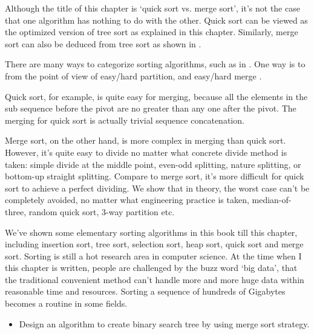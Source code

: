 \documentclass[UTF8]{article}
\begin{document}
Although the title of this chapter is `quick sort vs. merge sort', it's not the case that one
algorithm has nothing to do with the other. Quick sort can be viewed as the optimized version of
tree sort as explained in this chapter. Similarly, merge sort can also be deduced from tree sort
as shown in \cite{sort-deriving}.

There are many ways to categorize sorting algorithms, such as in \cite{TAOCP}. One way is to
from the point of view of easy/hard partition, and easy/hard merge \cite{algo-fp}.

Quick sort, for example, is quite easy for merging, because all the elements in the sub
sequence before the pivot are no greater than any one after the pivot. The merging for
quick sort is actually trivial sequence concatenation.

Merge sort, on the other hand, is more complex in merging than quick sort. However, it's
quite easy to divide no matter what concrete divide method is taken:
simple divide at the middle point, even-odd splitting, nature splitting, or bottom-up
straight splitting. Compare to merge sort, it's more difficult for quick sort to
achieve a perfect dividing. We show that in theory, the worst case can't be completely
avoided, no matter what engineering practice is taken, median-of-three, random quick sort,
3-way partition etc.

We've shown some elementary sorting algorithms in this book till this chapter, including
insertion sort, tree sort, selection sort, heap sort, quick sort and merge sort. Sorting
is still a hot research area in computer science. At the time when I this chapter is written,
people are challenged by the buzz word `big data', that the traditional convenient method
can't handle more and more huge data within reasonable time and resources.
Sorting a sequence of hundreds of Gigabytes becomes a routine in some fields.

\begin{Exercise}
  \begin{itemize}
    \item Design an algorithm to create binary search tree by using merge sort strategy.
  \end{itemize}
\end{Exercise}
\end{document}
